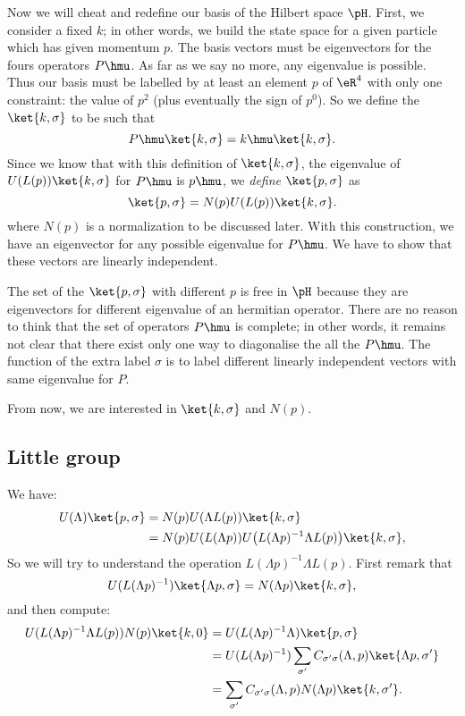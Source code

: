 Now we will cheat and redefine our basis of the Hilbert space $\pH$. First, we consider a fixed $k$; in other words, we build the state space for a given particle which has given momentum $p$.  The basis vectors must be eigenvectors for the fours operators $P\hmu$. As far as we say no more, any eigenvalue is possible. Thus our basis must be labelled by at least an element $p$ of $\eR^4$ with only one constraint: the value of $p^2$ (plus eventually the sign of $p^0$). So we define the $\ket{k,\sigma}$ to be such that
\[
	P\hmu\ket{k,\sigma}=k\hmu\ket{k,\sigma}.
\]
Since we know that with this definition of $\ket{k,\sigma}$, the eigenvalue of $U(L(p))\ket{k,\sigma}$ for $P\hmu$ is $p\hmu$, we \emph{define} $\ket{p,\sigma}$ as
\begin{equation}
	\ket{p,\sigma}=N(p)U(L(p))\ket{k,\sigma}.
\end{equation}
where $N(p)$ is a normalization to be discussed later. With this construction, we have an eigenvector for any possible eigenvalue for $P\hmu$. We have to show that these vectors are linearly independent.

The set of the $\ket{p,\sigma}$ with different $p$ is free in $\pH$ because they are eigenvectors for different eigenvalue of an hermitian operator. There are no reason to think that the set of operators $P\hmu$ is complete; in other words, it remains not clear that there exist only one way to diagonalise the all the $P\hmu$. The function of the extra label $\sigma$ is to label different linearly independent vectors with same eigenvalue for $P$.

From now, we are interested in $\ket{k,\sigma}$ and $N(p)$.

\subsection{Little group}

We have:
\begin{equation}
	\begin{split}
		U(\Lambda)\ket{p,\sigma}&=N(p)U(\Lambda L(p))\ket{k,\sigma}\\
		&=N(p)U(L(\Lambda p))U\big(  L(\Lambda p)^{-1}\Lambda L(p) \big)\ket{k,\sigma},
	\end{split}
\end{equation}
So we will try to understand the operation $L(\Lambda p)^{-1}\Lambda L(p)$. First remark that
\[
	U(L(\Lambda p)^{-1})\ket{\Lambda p,\sigma}=N(\Lambda p)\ket{k,\sigma},
\]
and then compute:
\begin{equation}
	\begin{split}
		U(L(\Lambda p)^{-1}\Lambda L(p) )N(p)\ket{k,0}&=U(L(\Lambda p)^{-1}\Lambda)\ket{p,\sigma}\\
		&=U(L(\Lambda p)^{-1})\sum_{\sigma'}
		C_{\sigma'\sigma}(\Lambda,p)\ket{\Lambda p,\sigma'}\\
		&=\sum_{\sigma'}C_{\sigma'\sigma}(\Lambda,p)
		N(\Lambda p)\ket{k,\sigma'}.
	\end{split}
\end{equation}

